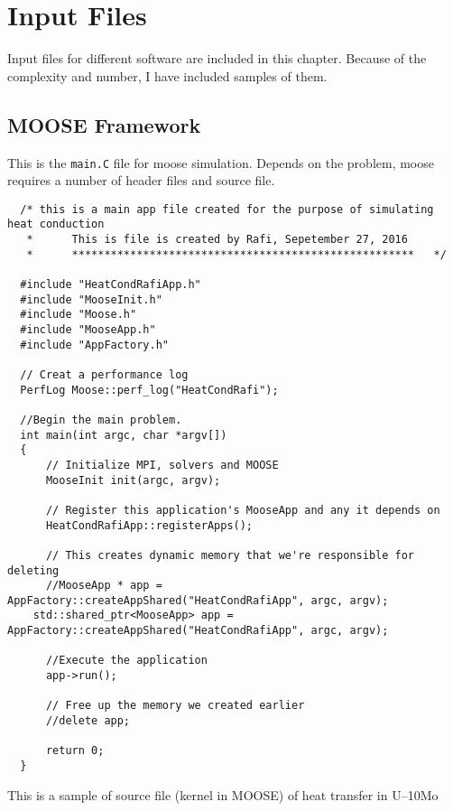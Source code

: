\chapter{Input Files}\label{appen_inputfiles}
Input files for different software are included in this chapter. Because of the complexity and number, I have included samples of them.

\section{MOOSE Framework}
This is the \texttt{main.C} file for moose simulation. Depends on the problem, moose requires a number of header files and source file.  

\lstset{style=cpp}
\begin{lstlisting}
  /* this is a main app file created for the purpose of simulating heat conduction
   *      This is file is created by Rafi, Sepetember 27, 2016
   *      *****************************************************   */
  
  #include "HeatCondRafiApp.h"
  #include "MooseInit.h"
  #include "Moose.h"
  #include "MooseApp.h"
  #include "AppFactory.h"
  
  // Creat a performance log
  PerfLog Moose::perf_log("HeatCondRafi");
  
  //Begin the main problem.
  int main(int argc, char *argv[])
  {
      // Initialize MPI, solvers and MOOSE
      MooseInit init(argc, argv);
  
      // Register this application's MooseApp and any it depends on
      HeatCondRafiApp::registerApps();
  
      // This creates dynamic memory that we're responsible for deleting
      //MooseApp * app =  AppFactory::createAppShared("HeatCondRafiApp", argc, argv);
    std::shared_ptr<MooseApp> app = AppFactory::createAppShared("HeatCondRafiApp", argc, argv);
  
      //Execute the application
      app->run();
  
      // Free up the memory we created earlier
      //delete app;
  
      return 0;
  }
\end{lstlisting}
\pagebreak
This is a sample of source file (kernel in MOOSE) of heat transfer in U--10Mo 
\lstset{style=cpp}
